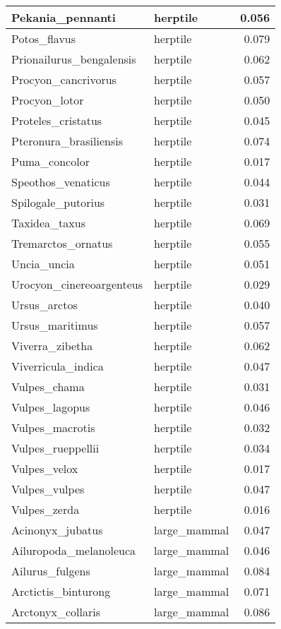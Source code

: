 \begin{table}
\begin{tabular}[t]{l|l|r}
\hline
Pekania\_pennanti & herptile & 0.056\\
\hline
Potos\_flavus & herptile & 0.079\\
\hline
Prionailurus\_bengalensis & herptile & 0.062\\
\hline
Procyon\_cancrivorus & herptile & 0.057\\
\hline
Procyon\_lotor & herptile & 0.050\\
\hline
Proteles\_cristatus & herptile & 0.045\\
\hline
Pteronura\_brasiliensis & herptile & 0.074\\
\hline
Puma\_concolor & herptile & 0.017\\
\hline
Speothos\_venaticus & herptile & 0.044\\
\hline
Spilogale\_putorius & herptile & 0.031\\
\hline
Taxidea\_taxus & herptile & 0.069\\
\hline
Tremarctos\_ornatus & herptile & 0.055\\
\hline
Uncia\_uncia & herptile & 0.051\\
\hline
Urocyon\_cinereoargenteus & herptile & 0.029\\
\hline
Ursus\_arctos & herptile & 0.040\\
\hline
Ursus\_maritimus & herptile & 0.057\\
\hline
Viverra\_zibetha & herptile & 0.062\\
\hline
Viverricula\_indica & herptile & 0.047\\
\hline
Vulpes\_chama & herptile & 0.031\\
\hline
Vulpes\_lagopus & herptile & 0.046\\
\hline
Vulpes\_macrotis & herptile & 0.032\\
\hline
Vulpes\_rueppellii & herptile & 0.034\\
\hline
Vulpes\_velox & herptile & 0.017\\
\hline
Vulpes\_vulpes & herptile & 0.047\\
\hline
Vulpes\_zerda & herptile & 0.016\\
\hline
Acinonyx\_jubatus & large\_mammal & 0.047\\
\hline
Ailuropoda\_melanoleuca & large\_mammal & 0.046\\
\hline
Ailurus\_fulgens & large\_mammal & 0.084\\
\hline
Arctictis\_binturong & large\_mammal & 0.071\\
\hline
Arctonyx\_collaris & large\_mammal & 0.086\\

\end{tabular}
\end{table}
